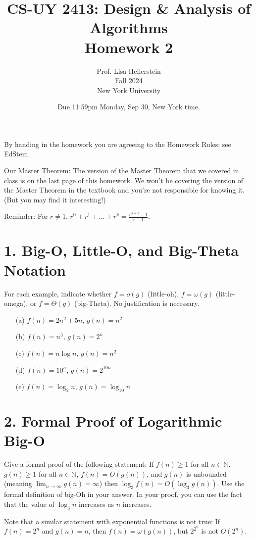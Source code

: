 \documentclass{article}
\title{CS-UY 2413: Design \& Analysis of Algorithms \\ Homework 2}
\author{Prof. Lisa Hellerstein \\ Fall 2024 \\ New York University}
\date{Due 11:59pm Monday, Sep 30, New York time.}
\begin{document}
\maketitle

\noindent By handing in the homework you are agreeing to the Homework Rules; see EdStem.

\noindent Our Master Theorem: The version of the Master Theorem that we covered in class is on the last page of this homework. We won’t be covering the version of the Master Theorem in the textbook and you’re not responsible for knowing it. (But you may find it interesting!)

\noindent Reminder: For $r \neq 1$, $r^0 + r^1 + \dots + r^k = \frac{r^{k+1} - 1}{r - 1}$.

\section*{1. Big-O, Little-O, and Big-Theta Notation}

For each example, indicate whether $f = o(g)$ (little-oh), $f = \omega(g)$ (little-omega), or $f = \Theta(g)$ (big-Theta). No justification is necessary.

\begin{enumerate}
    \item[(a)] $f(n) = 2n^2 + 5n$, $g(n) = n^2$
    \item[(b)] $f(n) = n^3$, $g(n) = 2^n$
    \item[(c)] $f(n) = n \log n$, $g(n) = n^2$
    \item[(d)] $f(n) = 10^n$, $g(n) = 2^{10n}$
    \item[(e)] $f(n) = \log_2 n$, $g(n) = \log_{10} n$
\end{enumerate}

\section*{2. Formal Proof of Logarithmic Big-O}

Give a formal proof of the following statement: If $f(n) \geq 1$ for all $n \in \mathbb{N}$, $g(n) \geq 1$ for all $n \in \mathbb{N}$, $f(n) = O(g(n))$, and $g(n)$ is unbounded (meaning $\lim_{n \to \infty} g(n) = \infty$) then $\log_3 f(n) = O(\log_3 g(n))$. Use the formal definition of big-Oh in your answer. In your proof, you can use the fact that the value of $\log_3 n$ increases as $n$ increases.

Note that a similar statement with exponential functions is not true: If $f(n) = 2^n$ and $g(n) = n$, then $f(n) = \omega(g(n))$, but $2^{2^n}$ is not $O(2^n)$.
\end{document}
